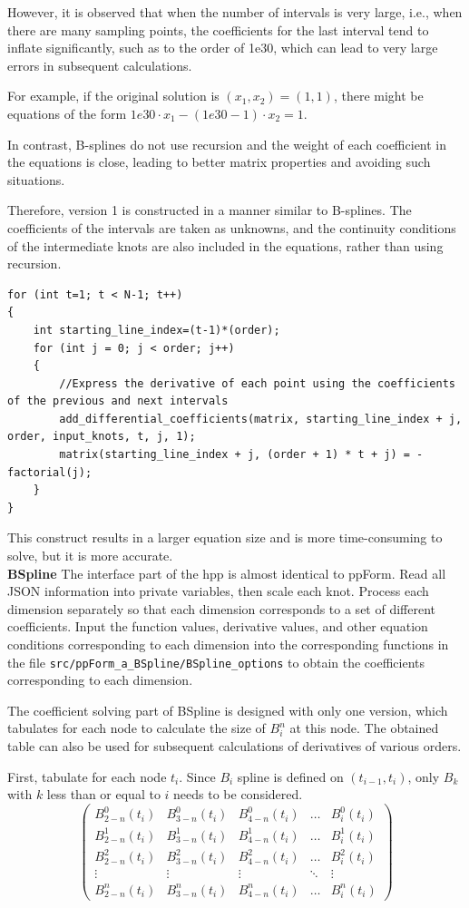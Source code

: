 \documentclass[a4paper]{article}
\begin{document}
However, it is observed that when the number of intervals is very large, i.e., when there are many sampling points, the coefficients for the last interval tend to inflate significantly, such as to the order of 1e30, which can lead to very large errors in subsequent calculations.

For example, if the original solution is $(x_1,x_2)=(1,1)$, there might be equations of the form $1e30 \cdot x_1 - (1e30 - 1) \cdot x_2 = 1$.

In contrast, B-splines do not use recursion and the weight of each coefficient in the equations is close, leading to better matrix properties and avoiding such situations.

Therefore, version 1 is constructed in a manner similar to B-splines. The coefficients of the intervals are taken as unknowns, and the continuity conditions of the intermediate knots are also included in the equations, rather than using recursion.

\begin{verbatim}
for (int t=1; t < N-1; t++)
{
    int starting_line_index=(t-1)*(order);
    for (int j = 0; j < order; j++)
    {
        //Express the derivative of each point using the coefficients of the previous and next intervals
        add_differential_coefficients(matrix, starting_line_index + j, order, input_knots, t, j, 1);
        matrix(starting_line_index + j, (order + 1) * t + j) = -factorial(j);
    }
}
\end{verbatim}

This construct results in a larger equation size and is more time-consuming to solve, but it is more accurate.\\
\textbf{BSpline}
The interface part of the hpp is almost identical to ppForm. Read all JSON information into private variables, then scale each knot. Process each dimension separately so that each dimension corresponds to a set of different coefficients. Input the function values, derivative values, and other equation conditions corresponding to each dimension into the corresponding functions in the file \texttt{src/ppForm\_a\_BSpline/BSpline\_options} to obtain the coefficients corresponding to each dimension.

The coefficient solving part of BSpline is designed with only one version, which tabulates for each node to calculate the size of $B^n_{i}$ at this node. The obtained table can also be used for subsequent calculations of derivatives of various orders.

First, tabulate for each node $t_i$. Since $B_i$ spline is defined on $(t_{i-1},t_i)$, only $B_k$ with $k$ less than or equal to $i$ needs to be considered.
\[
\begin{pmatrix}
B^0_{2-n}(t_i) & B^0_{3-n}(t_i) & B^0_{4-n}(t_i) & \dots & B^0_{i}(t_i) \\
B^1_{2-n}(t_i) & B^1_{3-n}(t_i) & B^1_{4-n}(t_i) & \dots & B^1_{i}(t_i) \\
B^2_{2-n}(t_i) & B^2_{3-n}(t_i) & B^2_{4-n}(t_i) & \dots & B^2_{i}(t_i) \\
\vdots & \vdots & \vdots & \ddots & \vdots \\
B^n_{2-n}(t_i) & B^n_{3-n}(t_i) & B^n_{4-n}(t_i) & \dots & B^n_{i}(t_i)
\end{pmatrix}
\]
\end{document}
